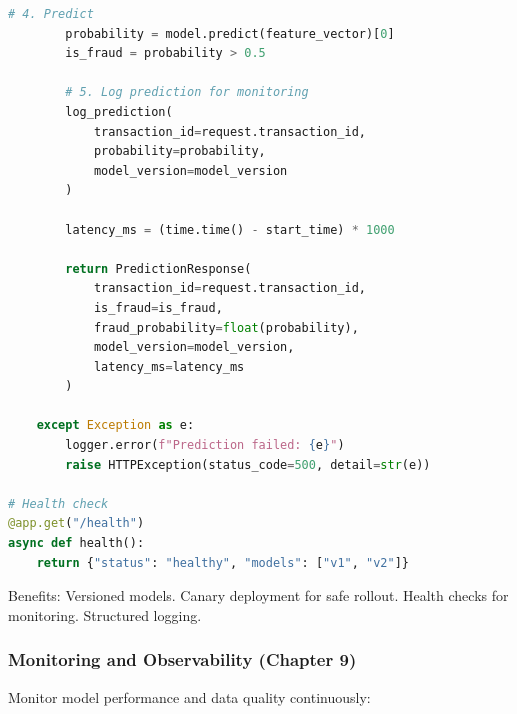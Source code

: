 \begin{lstlisting}[language=Python, caption={Model Serving with FastAPI}]
        # 4. Predict
        probability = model.predict(feature_vector)[0]
        is_fraud = probability > 0.5

        # 5. Log prediction for monitoring
        log_prediction(
            transaction_id=request.transaction_id,
            probability=probability,
            model_version=model_version
        )

        latency_ms = (time.time() - start_time) * 1000

        return PredictionResponse(
            transaction_id=request.transaction_id,
            is_fraud=is_fraud,
            fraud_probability=float(probability),
            model_version=model_version,
            latency_ms=latency_ms
        )

    except Exception as e:
        logger.error(f"Prediction failed: {e}")
        raise HTTPException(status_code=500, detail=str(e))

# Health check
@app.get("/health")
async def health():
    return {"status": "healthy", "models": ["v1", "v2"]}
\end{lstlisting}

Benefits: Versioned models. Canary deployment for safe rollout. Health checks for monitoring. Structured logging.

\subsubsection{Monitoring and Observability (Chapter 9)}

Monitor model performance and data quality continuously:

